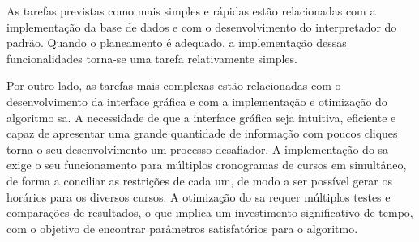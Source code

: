 As tarefas previstas como mais simples e rápidas estão relacionadas com a implementação da base de dados e com o desenvolvimento do interpretador do padrão. Quando o planeamento é adequado, a implementação dessas funcionalidades torna-se uma tarefa relativamente simples.

Por outro lado, as tarefas mais complexas estão relacionadas com o desenvolvimento da interface gráfica e com a implementação e otimização do algoritmo \gls{sa}. A necessidade de que a interface gráfica seja intuitiva, eficiente e capaz de apresentar uma grande quantidade de informação com poucos cliques torna o seu desenvolvimento um processo desafiador. A implementação do \gls{sa} exige o seu funcionamento para múltiplos cronogramas de cursos em simultâneo, de forma a conciliar as restrições de cada um, de modo a ser possível gerar os horários para os diversos cursos. A otimização do \gls{sa} requer múltiplos testes e comparações de resultados, o que implica um investimento significativo de tempo, com o objetivo de encontrar parâmetros satisfatórios para o algoritmo.
